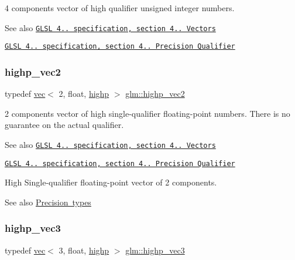 4 components vector of high qualifier unsigned integer numbers.

\begin{DoxySeeAlso}{See also}
\href{http://www.opengl.org/registry/doc/GLSLangSpec.4.20.8.pdf}{\tt G\+L\+SL 4.. specification, section 4.. Vectors} 

\href{http://www.opengl.org/registry/doc/GLSLangSpec.4.20.8.pdf}{\tt G\+L\+SL 4.. specification, section 4.. Precision Qualifier} 
\end{DoxySeeAlso}
\mbox{\label{group__core__precision_gad588ab946806864499d6559c186ce3ba}} 
\subsubsection{\texorpdfstring{highp\+\_\+vec2}{highp\_vec2}}
{\footnotesize\ttfamily typedef \mbox{\hyperlink{structglm_1_1vec}{vec}}$<$ 2, float, \mbox{\hyperlink{namespaceglm_a36ed105b07c7746804d7fdc7cc90ff25ac6f7eab42eacbb10d59a58e95e362074}{highp}} $>$ \mbox{\hyperlink{group__core__precision_gad588ab946806864499d6559c186ce3ba}{glm\+::highp\+\_\+vec2}}}

2 components vector of high single-\/qualifier floating-\/point numbers. There is no guarantee on the actual qualifier.

\begin{DoxySeeAlso}{See also}
\href{http://www.opengl.org/registry/doc/GLSLangSpec.4.20.8.pdf}{\tt G\+L\+SL 4.. specification, section 4.. Vectors} 

\href{http://www.opengl.org/registry/doc/GLSLangSpec.4.20.8.pdf}{\tt G\+L\+SL 4.. specification, section 4.. Precision Qualifier}
\end{DoxySeeAlso}
High Single-\/qualifier floating-\/point vector of 2 components. \begin{DoxySeeAlso}{See also}
\mbox{\hyperlink{group__core__precision}{Precision types}} 
\end{DoxySeeAlso}
\mbox{\label{group__core__precision_ga37ff190d92f9be26223a5de4153b9133}} 
\subsubsection{\texorpdfstring{highp\+\_\+vec3}{highp\_vec3}}
{\footnotesize\ttfamily typedef \mbox{\hyperlink{structglm_1_1vec}{vec}}$<$ 3, float, \mbox{\hyperlink{namespaceglm_a36ed105b07c7746804d7fdc7cc90ff25ac6f7eab42eacbb10d59a58e95e362074}{highp}} $>$ \mbox{\hyperlink{group__core__precision_ga37ff190d92f9be26223a5de4153b9133}{glm\+::highp\+\_\+vec3}}}

